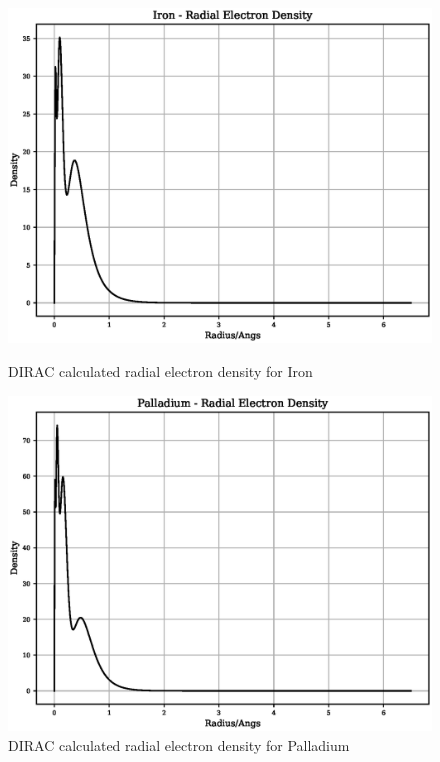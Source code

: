 \begin{figure}[htb]
	\begin{center}
  \includegraphics[width=0.9\linewidth]{chapters/potentials_fe_pd_ru/density/fe.eps}
  \caption{DIRAC calculated radial electron density for Iron}
  \label{fig:dirac-fe-density-plot}
	\end{center}
\endminipage\hfill
{}
	\begin{center}
  \includegraphics[width=0.9\linewidth]{chapters/potentials_fe_pd_ru/density/pd.eps}
  \caption{DIRAC calculated radial electron density for Palladium}
  \label{fig:dirac-pd-density-plot}
	\end{center}
\endminipage
\end{figure}

